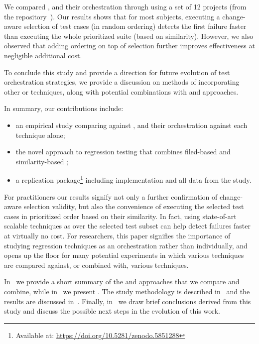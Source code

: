 We compared \ek, \fs and their orchestration through \fz using a set of 12 projects (from the \dfj repository~\cite{just2014defects4j}).
Our results shows that for most subjects, executing a change-aware selection of test cases (in random ordering) detects the first failure faster than executing the whole prioritized suite (based on similarity). However, we also observed that adding \fs ordering on top of \ek selection further improves effectiveness at negligible additional cost.

To conclude this study and provide a direction for future evolution of test orchestration strategies, we provide a discussion on methods of incorporating other \tcs or \tcp techniques, along with potential combinations with \tsr and \tsa approaches.

\noindent
In summary, our contributions include:
\begin{itemize}
\item an empirical study comparing \tcs against \tcp, and their orchestration against each technique alone;
\item the novel \fz approach to regression testing that combines filed-based \tcs and similarity-based \tcp;
\item a replication package\footnote{Available at: \url{https://doi.org/10.5281/zenodo.5851288}} including \fz implementation and all data from the study.
\end{itemize}

For practitioners our results signify not only a further confirmation of change-aware selection validity, but also the convenience of executing the selected test cases in prioritized order based on their similarity.
In fact, using state-of-art scalable techniques as \fs over the selected test subset can help detect failures faster at virtually no cost.
For researchers, this paper signifies the importance of studying regression techniques as an orchestration rather than individually, and 
opens up the floor for many potential experiments in which various \tcs techniques are compared against, or combined with, various \tcp techniques. 

In~ we provide a short summary of the \tcs and \tcp approaches that we compare and combine, while in~ we present \fz. 
The study methodology is described in~ and the results are discussed in~.
Finally, in~ we draw brief conclusions derived from this study and discuss the possible next steps in the evolution of this work. 
